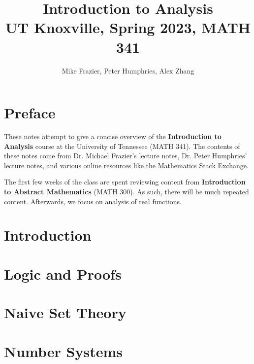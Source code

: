 \documentclass[12pt]{report}
\title{\textbf{Introduction to Analysis}\\
\large UT Knoxville, Spring 2023, MATH 341}
\author{Mike Frazier, Peter Humphries, Alex Zhang}
\begin{document}
\maketitle
\tableofcontents

\chapter*{Preface}
These notes attempt to give a concise overview of the \textbf{Introduction to Analysis} course at the University of Tennessee (MATH 341). The contents of these notes come from Dr. Michael Frazier's lecture notes, Dr. Peter Humphries' lecture notes, and various online resources like the Mathematics Stack Exchange.

The first few weeks of the class are spent reviewing content from \textbf{Introduction to Abstract Mathematics} (MATH 300). As such, there will be much repeated content. Afterwards, we focus on analysis of real functions.

\chapter{Introduction}


\chapter{Logic and Proofs}


\chapter{Naive Set Theory}


\chapter{Number Systems}


\amzindex
\end{document}
